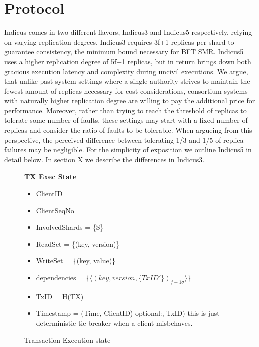 %
%
%
%
%
%
%
%

\section{Protocol}
Indicus comes in two different flavors, Indicus3 and Indicus5 respectively, relying on varying replication degrees. Indicus3 requires 3f+1 replicas per shard to guarantee consistency, the minimum bound necessary for BFT SMR. Indicus5 uses a higher replication degree of 5f+1 replicas, but in return brings down both gracious execution latency and complexity during uncivil executions. We argue, that unlike past system settings where a single authority strives to maintain the fewest amount of replicas necessary for cost considerations, consortium systems with naturally higher replication degree are willing to pay the additional price for performance. Moreover, rather than trying to reach the threshold of replicas to tolerate some number of faults, these settings may start with a fixed number of replicas and consider the ratio of faults to be tolerable. When argueing from this perspective, the perceived difference between tolerating 1/3 and 1/5 of replica failures may be negligible.
For the simplicity of exposition we outline Indicus5 in detail below. In section X we describe the differences in Indicus3.


\begin{figure}[t]
  \begin{mdframed}[roundcorner=10pt]
 	\textbf{TX Exec State}
 	\begin{itemize}
 	\item ClientID
 	\item ClientSeqNo
 	\item InvolvedShards = \{S\}
 	\item ReadSet = \{(key, version)\}
 	\item WriteSet = \{(key, value)\}
 	\item dependencies = \{$\langle (key, version, \{TxID'\})_{f+1 \sigma} \rangle$\}
 	\item TxID = H(TX)
 	\item Timestamp = (Time, ClientID)  optional:, TxID) this is just deterministic tie breaker when a client misbehaves.
 	\end{itemize}
  \end{mdframed}
  \caption{Transaction Execution state}
  \label{fig:TX}
\end{figure}

